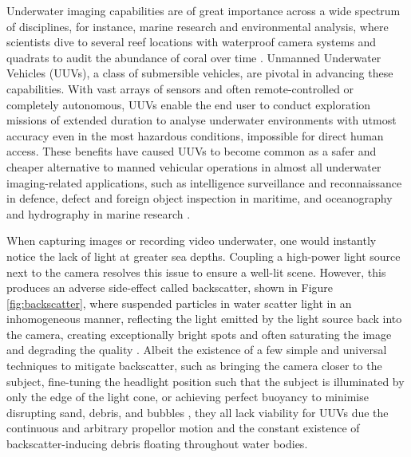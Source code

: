 Underwater imaging capabilities are of great importance across a wide spectrum of disciplines, for instance, marine research and environmental analysis, where scientists dive to several reef locations with waterproof camera systems and quadrats to audit the abundance of coral over time \cite{universityofhawaiiPracticesScienceUnderwater}. Unmanned Underwater Vehicles (UUVs), a class of submersible vehicles, are pivotal in advancing these capabilities. With vast arrays of sensors and often remote-controlled or completely autonomous, UUVs enable the end user to conduct exploration missions of extended duration to analyse underwater environments with utmost accuracy even in the most hazardous conditions, impossible for direct human access. These benefits have caused UUVs to become common as a safer and cheaper alternative to manned vehicular operations in almost all underwater imaging-related applications, such as intelligence surveillance and reconnaissance in defence, defect and foreign object inspection in maritime, and oceanography and hydrography in marine research \cite{yannickallardUnmannedUnderwaterVehicle2014}.

When capturing images or recording video underwater, one would instantly notice the lack of light at greater sea depths. Coupling a high-power light source next to the camera resolves this issue to ensure a well-lit scene. However, this produces an adverse side-effect called backscatter, shown in Figure \ref{fig:backscatter}, where suspended particles in water scatter light in an inhomogeneous manner, reflecting the light emitted by the light source back into the camera, creating exceptionally bright spots and often saturating the image and degrading the quality \cite{sidharthshanmugamInitialReportMachine2024}. Albeit the existence of a few simple and universal techniques to mitigate backscatter, such as bringing the camera closer to the subject, fine-tuning the headlight position such that the subject is illuminated by only the edge of the light cone, or achieving perfect buoyancy to minimise disrupting sand, debris, and bubbles \cite{brentdurandEasyWaysEliminate2013}, they all lack viability for UUVs due the continuous and arbitrary propellor motion and the constant existence of backscatter-inducing debris floating throughout water bodies.

